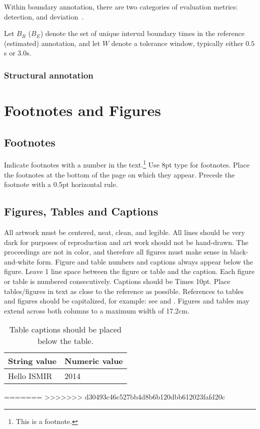 \documentclass{article}
\begin{document}
Within boundary annotation, there are two categories of evaluation metrics: detection,
and deviation~\cite{turnbull2007}.

Let $B_R$ ($B_E$) denote the set of unique interval boundary times in the reference 
(estimated) annotation, and let $W$ denote a tolerance window, typically either $0.5$s
or $3.0$s.  


\subsubsection{Structural annotation}



\section{Footnotes and Figures}

\subsection{Footnotes}

Indicate footnotes with a number in the text.\footnote{This is a footnote.}
Use 8pt type for footnotes. Place the footnotes at the bottom of the page on which they appear.
Precede the footnote with a 0.5pt horizontal rule.

\subsection{Figures, Tables and Captions}

All artwork must be centered, neat, clean, and legible.
All lines should be very dark for purposes of reproduction and art work should not be hand-drawn.
The proceedings are not in color, and therefore all figures must make sense in black-and-white form.
Figure and table numbers and captions always appear below the figure.
Leave 1 line space between the figure or table and the caption.
Each figure or table is numbered consecutively. Captions should be Times 10pt.
Place tables/figures in text as close to the reference as possible.
References to tables and figures should be capitalized, for example:
see  and .
Figures and tables may extend across both columns to a maximum width of 17.2cm.

\begin{table}
 \begin{center}
 \begin{tabular}{|l|l|}
  \hline
  String value & Numeric value \\
  \hline
  Hello ISMIR  & 2014 \\
  \hline
 \end{tabular}
\end{center}
 \caption{Table captions should be placed below the table.}
 \label{tab:example}
\end{table}
=======
>>>>>>> d30493c46c527bb4d8b6b120dbb612023fafd20c
\end{document}
